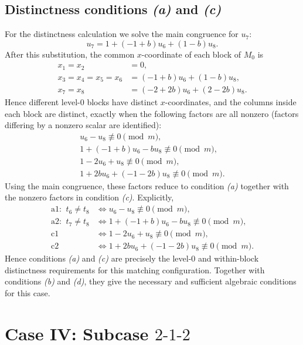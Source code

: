 \documentclass[11pt]{article}
\newcommand{\mymod}{\pmod m}
\begin{document}
\subsection{Distinctness conditions \emph{(a)} and \emph{(c)}}
For the distinctness calculation we solve the main congruence for $u_{7}$:
\[
u_{7}=1 + \left(-1 + b\right)u_{6} + \left(1 - b\right)u_{8}.
\]
After this substitution, the common $x$-coordinate of each block of $M_0$ is
\[
\begin{aligned}
x_{1}=x_{2}&=0,\\
x_{3}=x_{4}=x_{5}=x_{6}&=\left(-1 + b\right)u_{6} + \left(1 - b\right)u_{8},\\
x_{7}=x_{8}&=\left(-2 + 2b\right)u_{6} + \left(2 - 2b\right)u_{8}.
\end{aligned}
\]
Hence different level-$0$ blocks have distinct $x$-coordinates, and the columns inside each block are distinct, exactly when the following factors are all nonzero (factors differing by a nonzero scalar are identified):
\[
\begin{gathered}
u_{6} - u_{8}\not\equiv 0\mymod,\\
1 + \left(-1 + b\right)u_{6} - bu_{8}\not\equiv 0\mymod,\\
1 - 2u_{6} + u_{8}\not\equiv 0\mymod,\\
1 + 2bu_{6} + \left(-1 - 2b\right)u_{8}\not\equiv 0\mymod.
\end{gathered}
\]
Using the main congruence, these factors reduce to condition \emph{(a)} together with the nonzero factors in condition \emph{(c)}.  Explicitly,
\[
\begin{aligned}
\text{a1: }\ t_6 \neq t_8&\Longleftrightarrow u_{6} - u_{8}\not\equiv0\mymod,\\
\text{a2: }\ t_7 \neq t_8&\Longleftrightarrow 1 + \left(-1 + b\right)u_{6} - bu_{8}\not\equiv0\mymod,\\
\text{c1}&\Longleftrightarrow 1 - 2u_{6} + u_{8}\not\equiv0\mymod,\\
\text{c2}&\Longleftrightarrow 1 + 2bu_{6} + \left(-1 - 2b\right)u_{8}\not\equiv0\mymod.
\end{aligned}
\]
Hence conditions \emph{(a)} and \emph{(c)} are precisely the level-$0$ and within-block distinctness requirements for this matching configuration.  Together with conditions \emph{(b)} and \emph{(d)}, they give the necessary and sufficient algebraic conditions for this case.
\section{Case IV: Subcase $2\text{-}1\text{-}2$}
\end{document}
